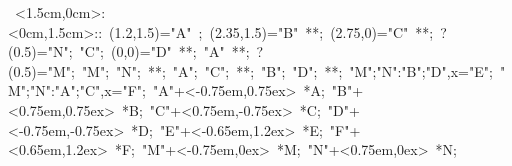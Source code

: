 
%

\hbox{
\xy    <1.5cm,0cm>:<0cm,1.5cm>::
       (1.2,1.5)="A" ; (2.35,1.5)="B" **\dir{-};  (2.75,0)="C" **\dir{-};  ?(0.5)="N"; 
       "C"; (0,0)="D" **\dir{-}; "A" **\dir{-}; ?(0.5)="M";
       "M"; "N"; **\dir{-}; "A"; "C"; **\dir{-}; "B"; "D"; **\dir{-};
       {"M";"N":"B";"D",x}="E"; {"M";"N":"A";"C",x}="F"; 
       "A"+<-0.75em,0.75ex> *{A};
       "B"+<0.75em,0.75ex> *{B};
       "C"+<0.75em,-0.75ex> *{C};
       "D"+<-0.75em,-0.75ex> *{D};
       "E"+<-0.65em,1.2ex> *{E};
       "F"+<0.65em,1.2ex> *{F};
       "M"+<-0.75em,0ex> *{M};
       "N"+<0.75em,0ex> *{N};
       \endxy}
	   


